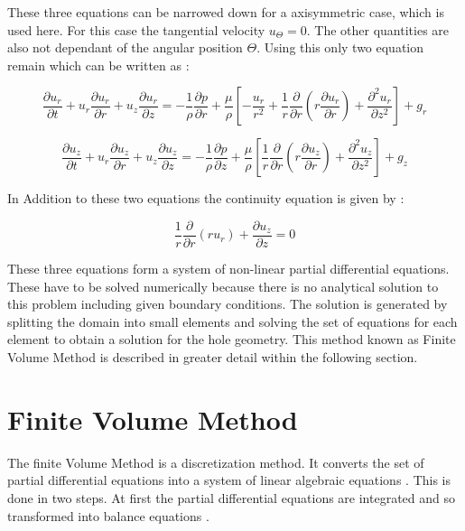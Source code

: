 \documentclass[../thesis.tex]{subfiles}
\begin{document}
These three equations can be narrowed down for a axisymmetric case, which is used here. For this case the tangential velocity $u_\Theta = 0$. The other quantities are also not dependant of the angular position $\Theta$. Using this only two equation remain which can be written as \cite{vitturi2016navier}:

\begin{equation}
	\dfrac{\partial u_r}{\partial t} + u_r \dfrac{\partial u_r}{\partial r}+ u_z \dfrac{\partial u_r}{\partial z} = - \dfrac{1}{\rho} \dfrac{\partial p}{\partial r} +  \dfrac{\mu}{\rho} \left[ -\dfrac{u_r}{r^2} + \dfrac{1}{r} \dfrac{\partial}{\partial r} \left( r \dfrac{\partial u_r}{\partial r} \right) + \dfrac{\partial^2 u_r}{\partial z^2} \right]	+ g_r
\end{equation}

\begin{equation}
	\dfrac{\partial u_z}{\partial t} + u_r \dfrac{\partial u_z}{\partial r}+ u_z \dfrac{\partial u_z}{\partial z} = - \dfrac{1}{\rho} \dfrac{\partial p}{\partial z} + \dfrac{\mu}{\rho} \left[ \dfrac{1}{r} \dfrac{\partial}{\partial r} \left( r \dfrac{\partial u_z}{\partial r} \right) + \dfrac{\partial^2 u_z}{\partial z^2} \right]	+ g_z
\end{equation} 

In Addition to these two equations the continuity equation is given by \cite{vitturi2016navier}:

\begin{equation}
	\dfrac{1}{r} \dfrac{\partial}{\partial r}(r u_r) + \dfrac{\partial u_z}{\partial z} = 0
\end{equation}

These three equations form a system of non-linear partial differential equations. These have to be solved numerically because there is no analytical solution to this problem including given boundary conditions. The solution is generated by splitting the domain into small elements and solving the set of equations for each element to obtain a solution for the hole geometry. This method known as Finite Volume Method is described in greater detail within the following section.

\section{Finite Volume Method}

The finite Volume Method is a discretization method. It converts the set of partial differential equations into a system of linear algebraic equations \cite{darwish2021finite}. This is done in two steps. At first the partial differential equations are integrated and so transformed into balance equations \cite{darwish2021finite}. 
\end{document}
